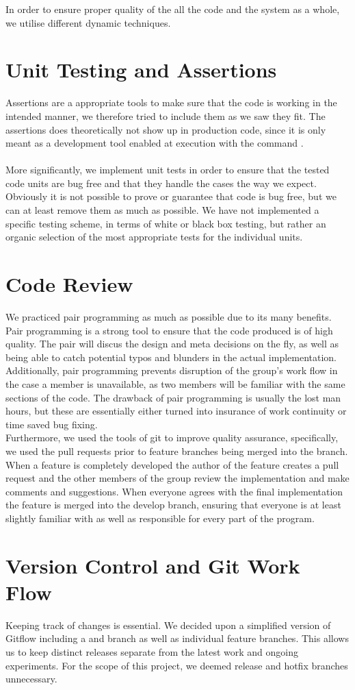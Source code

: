 In order to ensure proper quality of the all the code and the system as a whole, we utilise different dynamic techniques.

\section{Unit Testing and Assertions}
Assertions are a appropriate tools to make sure that the code is working in the intended manner, we therefore tried to include them as we saw they fit. The assertions does theoretically not show up in production code, since it is only meant as a development tool enabled at execution with the command .
\\ \\
More significantly, we implement unit tests in order to ensure that the tested code units are bug free and that they handle the cases the way we expect. Obviously it is not possible to prove or guarantee that code is bug free, but we can at least remove them as much as possible. We have not implemented a specific testing scheme, in terms of white or black box testing, but rather an organic selection of the most appropriate tests for the individual units.

\section{Code Review}
We practiced pair programming as much as possible due to its many benefits. \\
Pair programming is a strong tool to ensure that the code produced is of high quality. The pair will discus the design and meta decisions on the fly, as well as being able to catch potential typos and blunders in the actual implementation. Additionally, pair programming prevents disruption of the group's work flow in the case a member is unavailable, as two members will be familiar with the same sections of the code. The drawback of pair programming is usually the lost man hours, but these are essentially either turned into insurance of work continuity or time saved bug fixing. \\
Furthermore, we used the tools of git to improve quality assurance, specifically, we used the pull requests prior to feature branches being merged into the  branch. When a feature is completely developed the author of the feature creates a pull request and the other members of the group review the implementation and make comments and suggestions. When everyone agrees with the final implementation the feature is merged into the develop branch, ensuring that everyone is at least slightly familiar with as well as responsible for every part of the program.

\section{Version Control and Git Work Flow}
Keeping track of changes is essential. We decided upon a simplified version of Gitflow including a  and  branch as well as individual feature branches. This allows us to keep distinct releases separate from the latest work and ongoing experiments. For the scope of this project, we deemed release and hotfix branches unnecessary.
